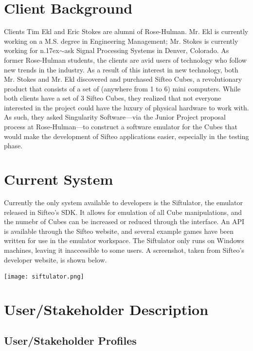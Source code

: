 \documentclass[12pt]{article}
\begin{document}
\section{Client Background}
Clients Tim Ekl and Eric Stokes are alumni of Rose-Hulman. Mr. Ekl is currently working on a M.S. degree in Engineering Management; Mr. Stokes is currently working for n{\raise.17ex\hbox{$\scriptstyle\sim$}}ask Signal Processing Systems in Denver, Colorado. As former Rose-Hulman students, the clients are avid users of technology who follow new trends in the industry. As a result of this interest in new technology, both Mr. Stokes and Mr. Ekl discovered and purchased Sifteo Cubes, a revolutionary product that consists of a set of (anywhere from 1 to 6) mini computers. While both clients have a set of 3 Sifteo Cubes, they realized that not everyone interested in the project could have the luxury of physical hardware to work with. As such, they asked Singularity Software---via the Junior Project proposal process at Rose-Hulman---to construct a software emulator for the Cubes that would make the development of Sifteo applications easier, especially in the testing phase.

\clearpage

\section{Current System}
Currently the only system available to developers is the Siftulator, the emulator released in Sifteo's SDK.  It allows for emulation of all Cube manipulations, and the numebr of Cubes can be increased or reduced through the interface.  An API is available through the Sifteo website, and several example games have been written for use in the emulator workspace.  The Siftulator only runs on Windows machines, leaving it inaccessible to some users.  A screenshot, taken from Sifteo's developer website, is shown below.
\begin{center}
        \texttt{[image: siftulator.png]}
\end{center}

\section{User/Stakeholder Description}

               \subsection{User/Stakeholder Profiles}
\end{document}
